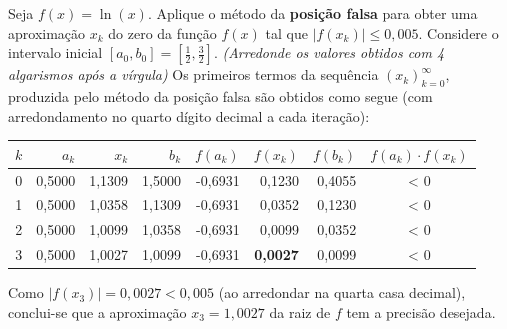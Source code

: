 \documentclass[12pt,a4paper]{article}
\begin{document}
\begin{ExerciseList}
\Exercise[title={2,0}] Seja $f(x) = \ln(x)$. Aplique o método da \textbf{posição falsa} para obter uma aproximação $x_k$ do zero da função $f(x)$ tal que $|f(x_k)| \leq 0,005$. Considere o intervalo inicial $[a_0, b_0] = [\frac{1}{2}, \frac{3}{2}]$.
{\color{blue} \textit{(Arredonde os valores obtidos com 4 algarismos após a vírgula)}}
\Answer
Os primeiros termos da sequência $(x_k)_{k=0}^\infty$, produzida pelo método da posição falsa são obtidos como segue (com arredondamento no quarto dígito decimal a cada iteração):
\medskip
\begin{center}
\begin{tabular}{rrrrrrrc}
\hline
$k$ & $a_k$ & $x_k$ & $b_k$ & $f(a_k)$ & $f(x_k)$ & $f(b_k)$ & $f(a_k)\cdot f(x_k)$ \\
\hline
0 & 0,5000 & 1,1309 & 1,5000 & -0,6931 & 0,1230 & 0,4055 & < 0 \\
1 & 0,5000 & 1,0358 & 1,1309 & -0,6931 & 0,0352 & 0,1230 & < 0 \\
2 & 0,5000 & 1,0099 & 1,0358 & -0,6931 & 0,0099 & 0,0352 & < 0 \\
3 & 0,5000 & 1,0027 & 1,0099 & -0,6931 & \textbf{0,0027} & 0,0099 & < 0 \\
\hline
\end{tabular}
\end{center}
\medskip
Como $|f(x_3)| = 0,0027 < 0,005$ (ao arredondar na quarta casa decimal), conclui-se que a aproximação $x_3 = 1,0027$ da raiz de $f$ tem a precisão desejada.


\end{ExerciseList}
\end{document}
